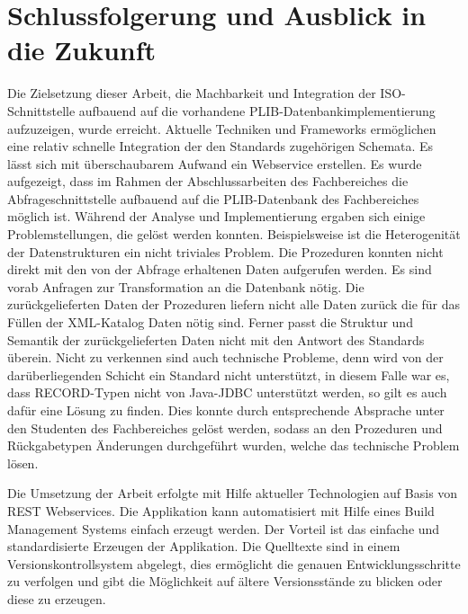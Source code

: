 \chapter*{Schlussfolgerung und Ausblick in die Zukunft}


Die Zielsetzung dieser Arbeit, die Machbarkeit und Integration der ISO-Schnittstelle aufbauend auf die vorhandene PLIB-Datenbankimplementierung aufzuzeigen, wurde erreicht. Aktuelle Techniken und Frameworks ermöglichen eine relativ schnelle Integration der den Standards zugehörigen Schemata. Es lässt sich mit überschaubarem Aufwand ein \gls{Webservice} erstellen. 
Es wurde aufgezeigt, dass im Rahmen der Abschlussarbeiten des Fachbereiches die Abfrageschnittstelle aufbauend auf die PLIB-Datenbank des Fachbereiches möglich ist. Während der Analyse und Implementierung ergaben sich einige Problemstellungen, die gelöst werden konnten. Beispielsweise ist die Heterogenität der Datenstrukturen ein nicht triviales Problem. Die Prozeduren konnten nicht direkt mit den von der Abfrage erhaltenen Daten aufgerufen werden. Es sind vorab Anfragen zur Transformation an die Datenbank nötig. 
Die zurückgelieferten Daten der Prozeduren liefern nicht alle Daten zurück die für das Füllen der XML-Katalog Daten nötig sind. Ferner passt die Struktur und Semantik der zurückgelieferten Daten nicht mit den Antwort des Standards überein. Nicht zu verkennen sind auch technische Probleme, denn wird von der darüberliegenden Schicht ein Standard nicht unterstützt, in diesem Falle war es, dass RECORD-Typen nicht von Java-JDBC unterstützt werden, so gilt es auch dafür eine Lösung zu finden. 
Dies konnte durch entsprechende Absprache unter den Studenten des Fachbereiches gelöst werden, sodass an den Prozeduren und Rückgabetypen Änderungen durchgeführt wurden, welche das technische Problem lösen.

Die Umsetzung der Arbeit erfolgte mit Hilfe aktueller Technologien auf Basis von \gls{REST} \glspl{Webservice}. Die Applikation kann automatisiert mit Hilfe eines Build Management Systems einfach erzeugt werden. Der Vorteil ist das einfache und standardisierte Erzeugen der Applikation. Die Quelltexte sind in einem Versionskontrollsystem abgelegt, dies ermöglicht die genauen Entwicklungsschritte zu verfolgen und gibt die Möglichkeit auf ältere Versionsstände zu blicken oder diese zu erzeugen. 

